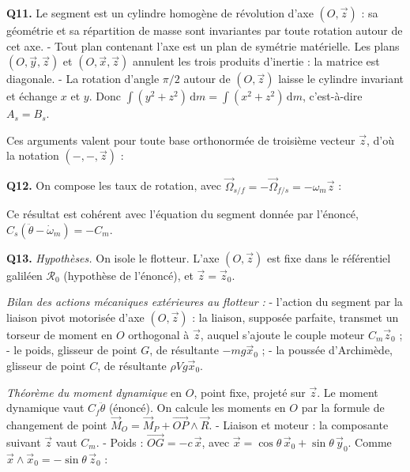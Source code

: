 \documentclass[11pt,a4paper]{article}
\newcommand{\equationajustee}[1]{%
  \sbox{\boiteequation}{$\displaystyle #1$}%
  \ifdim\wd\boiteequation>\linewidth
    \[\resizebox{\linewidth}{!}{\usebox{\boiteequation}}\]%
  \else
    \[#1\]%
  \fi}
\begin{document}
\textbf{Q11.} Le segment est un cylindre homogène de révolution d'axe \((O,\vec z)\) : sa géométrie et sa répartition de masse sont invariantes par toute rotation autour de cet axe.
- Tout plan contenant l'axe est un plan de symétrie matérielle. Les plans \((O,\vec y,\vec z)\) et \((O,\vec x,\vec z)\) annulent les trois produits d'inertie : la matrice est diagonale.
- La rotation d'angle \(\pi/2\) autour de \((O,\vec z)\) laisse le cylindre invariant et échange \(x\) et \(y\). Donc \(\int(y^2+z^2)\,\mathrm dm=\int(x^2+z^2)\,\mathrm dm\), c'est-à-dire \(A_s=B_s\).

Ces arguments valent pour toute base orthonormée de troisième vecteur \(\vec z\), d'où la notation \((-,-,\vec z)\) :

\equationajustee{\boxed{\bar{\bar I}_s(O)=\begin{pmatrix}A_s&0&0\\0&A_s&0\\0&0&C_s\end{pmatrix}_{(\vec x,\vec y,\vec z)}}}

\textbf{Q12.} On compose les taux de rotation, avec \(\vec\Omega_{s/f}=-\vec\Omega_{f/s}=-\omega_m\vec z\) :

\equationajustee{\begin{aligned}
\vec\Omega_{s/0}&=\vec\Omega_{s/f}+\vec\Omega_{f/0}\\
&=-\omega_m\,\vec z+\dot\theta\,\vec z
\end{aligned}}

\equationajustee{\boxed{\vec\Omega_{s/0}=(\dot\theta-\omega_m)\,\vec z}}

Ce résultat est cohérent avec l'équation du segment donnée par l'énoncé, \(C_s(\ddot\theta-\dot\omega_m)=-C_m\).

\textbf{Q13.} \emph{Hypothèses.} On isole le flotteur. L'axe \((O,\vec z)\) est fixe dans le référentiel galiléen \(\mathcal R_0\) (hypothèse de l'énoncé), et \(\vec z=\vec z_0\).

\emph{Bilan des actions mécaniques extérieures au flotteur :}
- l'action du segment par la liaison pivot motorisée d'axe \((O,\vec z)\) : la liaison, supposée parfaite, transmet un torseur de moment en \(O\) orthogonal à \(\vec z\), auquel s'ajoute le couple moteur \(C_m\vec z_0\) ;
- le poids, glisseur de point \(G\), de résultante \(-mg\vec x_0\) ;
- la poussée d'Archimède, glisseur de point \(C\), de résultante \(\rho Vg\vec x_0\).

\emph{Théorème du moment dynamique} en \(O\), point fixe, projeté sur \(\vec z\). Le moment dynamique vaut \(C_f\ddot\theta\) (énoncé). On calcule les moments en \(O\) par la formule de changement de point \(\vec M_O=\vec M_P+\overrightarrow{OP}\wedge\vec R\).
- Liaison et moteur : la composante suivant \(\vec z\) vaut \(C_m\).
- Poids : \(\overrightarrow{OG}=-c\,\vec x\), avec \(\vec x=\cos\theta\,\vec x_0+\sin\theta\,\vec y_0\). Comme \(\vec x\wedge\vec x_0=-\sin\theta\,\vec z_0\) :
\end{document}
